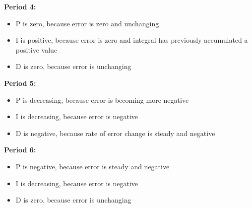 {\bf Period 4:}
 

\begin{itemize}
\item{}P is zero, because error is zero and unchanging
\item{}I is positive, because error is zero and integral has previously accumulated a positive value
\item{}D is zero, because error is unchanging
\end{itemize} 
\bigskip 
 

{\bf Period 5:}

\begin{itemize}
\item{}P is decreasing, because error is becoming more negative
\item{}I is decreasing, because error is negative
\item{}D is negative, because rate of error change is steady and negative
\end{itemize} 
\bigskip 
 

{\bf Period 6:}
 

\begin{itemize}
\item{}P is negative, because error is steady and negative
\item{}I is decreasing, because error is negative
\item{}D is zero, because error is unchanging
\end{itemize} 






